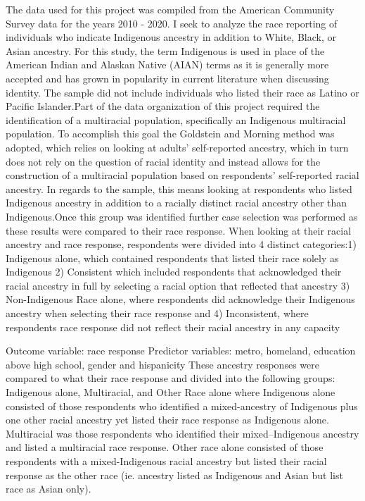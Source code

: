 \documentclass[
  12pt,
  letterpaper,
]{article}
\begin{document}
The data used for this project was compiled from the American Community
Survey data for the years 2010 - 2020. I seek to analyze the race
reporting of individuals who indicate Indigenous ancestry in addition to
White, Black, or Asian ancestry. For this study, the term Indigenous is
used in place of the American Indian and Alaskan Native (AIAN) terms as
it is generally more accepted and has grown in popularity in current
literature when discussing identity. The sample did not include
individuals who listed their race as Latino or Pacific Islander.Part of
the data organization of this project required the identification of a
multiracial population, specifically an Indigenous multiracial
population. To accomplish this goal the Goldstein and Morning method was
adopted, which relies on looking at adults' self-reported ancestry,
which in turn does not rely on the question of racial identity and
instead allows for the construction of a multiracial population based on
respondents' self-reported racial ancestry. In regards to the sample,
this means looking at respondents who listed Indigenous ancestry in
addition to a racially distinct racial ancestry other than
Indigenous.Once this group was identified further case selection was
performed as these results were compared to their race response. When
looking at their racial ancestry and race response, respondents were
divided into 4 distinct categories:1) Indigenous alone, which contained
respondents that listed their race solely as Indigenous 2) Consistent
which included respondents that acknowledged their racial ancestry in
full by selecting a racial option that reflected that ancestry 3)
Non-Indigenous Race alone, where respondents did acknowledge their
Indigenous ancestry when selecting their race response and 4)
Inconsistent, where respondents race response did not reflect their
racial ancestry in any capacity

Outcome variable: race response Predictor variables: metro, homeland,
education above high school, gender and hispanicity These ancestry
responses were compared to what their race response and divided into the
following groups: Indigenous alone, Multiracial, and Other Race alone
where Indigenous alone consisted of those respondents who identified a
mixed-ancestry of Indigenous plus one other racial ancestry yet listed
their race response as Indigenous alone. Multiracial was those
respondents who identified their mixed--Indigenous ancestry and listed a
multiracial race response. Other race alone consisted of those
respondents with a mixed-Indigenous racial ancestry but listed their
racial response as the other race (ie. ancestry listed as Indigenous and
Asian but list race as Asian only).
\end{document}
